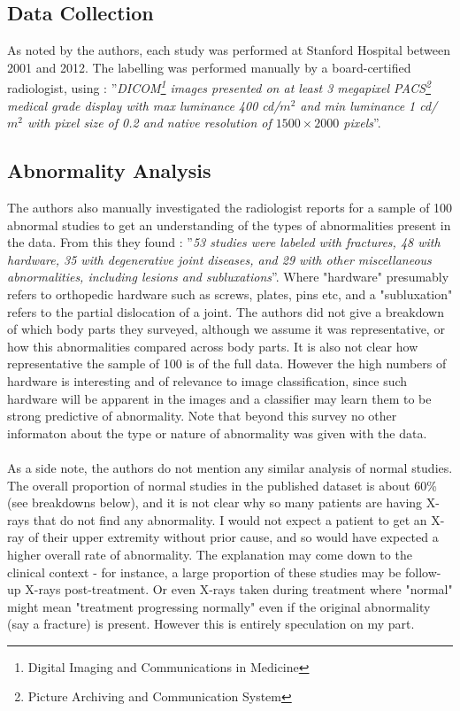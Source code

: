 \documentclass[11pt]{article} %
\theoremstyle{plain}
\theoremstyle{definition}
\begin{document}
\subsection{Data Collection}
As noted by the authors, each study was performed at Stanford Hospital between 2001 and 2012. The labelling was performed manually by a board-certified radiologist, using \cite{MURA2017}: ''\textit{DICOM\footnote{Digital Imaging and Communications in Medicine} images presented on at least 3 megapixel PACS\footnote{Picture Archiving and Communication System} medical grade display with max luminance 400 cd/\(m^2\) and min luminance 1 cd/\(m^2\) with pixel size of 0.2 and native resolution of \(1500 \times 2000\) pixels}''.

\subsection{Abnormality Analysis}
The authors also manually investigated the radiologist reports for a sample of 100 abnormal studies to get an understanding of the types of abnormalities present in the data. From this they found \cite{MURA2017}: ''\textit{53 studies were labeled with fractures, 48 with hardware, 35 with degenerative joint diseases, and 29 with other miscellaneous abnormalities, including lesions and subluxations}''. Where "hardware" presumably refers to orthopedic hardware such as screws, plates, pins etc, and a "subluxation" refers to the partial dislocation of a joint. The authors did not give a breakdown of which body parts they surveyed, although we assume it was representative, or how this abnormalities compared across body parts. It is also not clear how representative the sample of 100 is of the full data. However the high numbers of hardware is interesting and of relevance to image classification, since such hardware will be apparent in the images and a classifier may learn them to be strong predictive of abnormality. Note that beyond this survey no other informaton about the type or nature of abnormality was given with the data.
\\
\\
\noindent
As a side note, the authors do not mention any similar analysis of normal studies. The overall proportion of normal studies in the published dataset is about 60\% (see breakdowns below), and it is not clear why so many patients are having X-rays that do not find any abnormality. I would not expect a patient to get an X-ray of their upper extremity without prior cause, and so would have expected a higher overall rate of abnormality. The explanation may come down to the clinical context - for instance, a large proportion of these studies may be follow-up X-rays post-treatment. Or even X-rays taken during treatment where "normal" might mean "treatment progressing normally" even if the original abnormality (say a fracture) is present. However this is entirely speculation on my part.   
\end{document}
